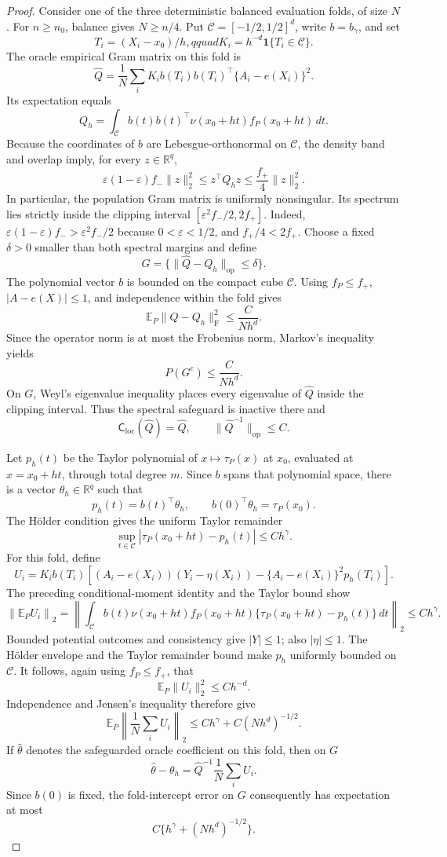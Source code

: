 \begin{proof}
Consider one of the three deterministic balanced evaluation folds, of size \(N\).  For \(n\geq n_0\), balance gives \(N\geq n/4\).  Put \(\mathcal C=[-1/2,1/2]^d\), write \(b=b_\gamma\), and set
\[
T_i=(X_i-x_0)/h,qquad
K_i=h^{-d}\mathbf 1\{T_i\in\mathcal C\}.
\]
The oracle empirical Gram matrix on this fold is
\[
\widehat Q=\frac1N\sum_i K_i b(T_i)b(T_i)^\top\{A_i-e(X_i)\}^2.
\]
Its expectation equals
\[
Q_h=\int_{\mathcal C}b(t)b(t)^\top
\nu(x_0+ht)f_P(x_0+ht)\,dt.
\]
Because the coordinates of \(b\) are Lebesgue-orthonormal on \(\mathcal C\), the density band and overlap imply, for every \(z\in\mathbb R^q\),
\[
\varepsilon(1-\varepsilon)f_-\lVert z\rVert_2^2
\leq z^\top Q_hz
\leq \frac{f_+}{4}\lVert z\rVert_2^2.
\]
In particular, the population Gram matrix is uniformly nonsingular.  Its spectrum lies strictly inside the clipping interval \([\varepsilon^2f_-/2,2f_+]\).  Indeed,
\(\varepsilon(1-\varepsilon)f_->\varepsilon^2f_-/2\) because \(0<\varepsilon<1/2\), and \(f_+/4<2f_+\).  Choose a fixed \(\delta>0\) smaller than both spectral margins and define
\[
G=\{\lVert\widehat Q-Q_h\rVert_{\mathrm{op}}\leq\delta\}.
\]
The polynomial vector \(b\) is bounded on the compact cube \(\mathcal C\).  Using \(f_P\leq f_+\), \(|A-e(X)|\leq1\), and independence within the fold gives
\[
\mathbb E_P\lVert\widehat Q-Q_h\rVert_{\mathrm F}^2
\leq \frac{C}{Nh^d}.
\]
Since the operator norm is at most the Frobenius norm, Markov's inequality yields
\[
P(G^c)\leq\frac{C}{Nh^d}.
\]
On \(G\), Weyl's eigenvalue inequality places every eigenvalue of \(\widehat Q\) inside the clipping interval.  Thus the spectral safeguard is inactive there and
\[
\mathsf C_{\mathrm{loc}}(\widehat Q)=\widehat Q,
\qquad
\lVert\widehat Q^{-1}\rVert_{\mathrm{op}}\leq C.
\]

Let \(p_h(t)\) be the Taylor polynomial of \(x\mapsto\tau_P(x)\) at \(x_0\), evaluated at \(x=x_0+ht\), through total degree \(m\).  Since \(b\) spans that polynomial space, there is a vector \(\theta_h\in\mathbb R^q\) such that
\[
p_h(t)=b(t)^\top\theta_h,
\qquad
b(0)^\top\theta_h=\tau_P(x_0).
\]
The H\"older condition gives the uniform Taylor remainder
\[
\sup_{t\in\mathcal C}
|\tau_P(x_0+ht)-p_h(t)|\leq Ch^\gamma.
\]
For this fold, define
\[
U_i=K_i b(T_i)\left[(A_i-e(X_i))(Y_i-\eta(X_i))
-\{A_i-e(X_i)\}^2p_h(T_i)\right].
\]
The preceding conditional-moment identity and the Taylor bound show
\[
\left\lVert\mathbb E_P U_i\right\rVert_2
=\left\lVert\int_{\mathcal C} b(t)\nu(x_0+ht)f_P(x_0+ht)
\{\tau_P(x_0+ht)-p_h(t)\}\,dt\right\rVert_2
\leq Ch^\gamma.
\]
Bounded potential outcomes and consistency give \(|Y|\leq1\); also \(|\eta|\leq1\).  The H\"older envelope and the Taylor remainder bound make \(p_h\) uniformly bounded on \(\mathcal C\).  It follows, again using \(f_P\leq f_+\), that
\[
\mathbb E_P\lVert U_i\rVert_2^2\leq Ch^{-d}.
\]
Independence and Jensen's inequality therefore give
\[
\mathbb E_P\left\lVert\frac1N\sum_iU_i\right\rVert_2
\leq Ch^\gamma+C(Nh^d)^{-1/2}.
\]
If \(\widehat\theta\) denotes the safeguarded oracle coefficient on this fold, then on \(G\)
\[
\widehat\theta-\theta_h
=\widehat Q^{-1}\frac1N\sum_iU_i.
\]
Since \(b(0)\) is fixed, the fold-intercept error on \(G\) consequently has expectation at most
\[
C\{h^\gamma+(Nh^d)^{-1/2}\}.
\]


\end{proof}
